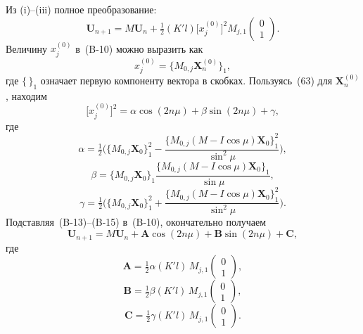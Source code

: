 \documentclass[11pt,a4paper]{article}
\begin{document}
Из (i)--(iii) полное преобразование:
\begin{equation}
\mathbf{U}_{n+1}
=M\mathbf{U}_n
+\tfrac12(K'l)\bigl[x_j^{(0)}\bigr]^2
M_{j,1}\begin{pmatrix}0\\ 1\end{pmatrix}.
\end{equation}
Величину $x_j^{(0)}$ в~(B-10) можно выразить как
\begin{equation}
x_j^{(0)}=\bigl\{M_{0,j}\mathbf{X}_n^{(0)}\bigr\}_1,
\end{equation}
где $\{\,\}_1$ означает первую компоненту вектора в скобках. Пользуясь~(63) для
$\mathbf{X}_n^{(0)}$, находим
\begin{equation}
\bigl[x_j^{(0)}\bigr]^2=\alpha\cos(2n\mu)+\beta\sin(2n\mu)+\gamma,
\end{equation}
где
\begin{equation}
\alpha=\tfrac12\Biggl(
\bigl\{M_{0,j}\mathbf{X}_0\bigr\}_1^2
-\frac{\bigl\{M_{0,j}(M-I\cos\mu)\mathbf{X}_0\bigr\}_1^2}{\sin^2\mu}\Biggr),
\end{equation}
\begin{equation}
\beta=\bigl\{M_{0,j}\mathbf{X}_0\bigr\}_1
\frac{\bigl\{M_{0,j}(M-I\cos\mu)\mathbf{X}_0\bigr\}_1}{\sin\mu},
\end{equation}
\begin{equation}
\gamma=\tfrac12\Biggl(
\bigl\{M_{0,j}\mathbf{X}_0\bigr\}_1^2
+\frac{\bigl\{M_{0,j}(M-I\cos\mu)\mathbf{X}_0\bigr\}_1^2}{\sin^2\mu}\Biggr).
\end{equation}
Подставляя~(B-13)--(B-15) в~(B-10), окончательно получаем
\begin{equation}
\mathbf{U}_{n+1}=M\mathbf{U}_n
+\mathbf{A}\cos(2n\mu)+\mathbf{B}\sin(2n\mu)+\mathbf{C},
\end{equation}
где
\begin{equation}
\mathbf{A}=\tfrac12\alpha(K'l)\,M_{j,1}\begin{pmatrix}0\\ 1\end{pmatrix},
\end{equation}
\begin{equation}
\mathbf{B}=\tfrac12\beta(K'l)\,M_{j,1}\begin{pmatrix}0\\ 1\end{pmatrix},
\end{equation}
\begin{equation}
\mathbf{C}=\tfrac12\gamma(K'l)\,M_{j,1}\begin{pmatrix}0\\ 1\end{pmatrix}.
\end{equation}
\end{document}
